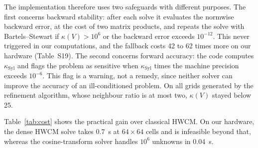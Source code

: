 \documentclass[smallextended,envcountsame]{svjour3}
\begin{document}
The implementation therefore uses two safeguards with different purposes. The first concerns backward
stability: after each solve it evaluates the normwise backward error, at the cost of two matrix products,
and repeats the solve with Bartels--Stewart if $\kappa(V)>10^6$ or the backward error exceeds $10^{-12}$.
This never triggered in our computations, and the fallback costs 42 to 62 times more on our hardware (Table~S19). The second
concerns forward accuracy: the code computes $\kappa_{\mathrm{Syl}}$ and flags the problem as sensitive when
$\kappa_{\mathrm{Syl}}$ times the machine precision exceeds $10^{-6}$. This flag is a warning, not a remedy,
since neither solver can improve the accuracy of an ill-conditioned problem. On all grids generated by the
refinement algorithm, whose neighbour ratio is at most two, $\kappa(V)$ stayed below 25.

Table~\ref{tab:cost} shows the practical gain over classical HWCM. On our hardware, the dense HWCM solve takes
0.7~s at $64\times64$ cells and is infeasible beyond that, whereas the cosine-transform solver handles
$10^6$ unknowns in 0.04~s.

\begin{table}[t]\centering\footnotesize
\caption{Adversarial grid families ($N=256$): eigenvector conditioning $\kappa(V)$, condition estimate
$\kappa_{\mathrm{Syl}}$ of the Sylvester problem, normwise backward errors of fast diagonalization (FDM) and
Bartels--Stewart (B--S), and relative difference of the two solutions.}\label{tab:fdmstab}

\end{table}
\begin{table}[t]\centering\footnotesize
\caption{Wall time in seconds of one solve with $N^2$ unknowns, on the CPU of Table~\ref{tab:env}. ``Dense'' is the classical
HWCM approach.}\label{tab:cost}

\end{table}
\end{document}
